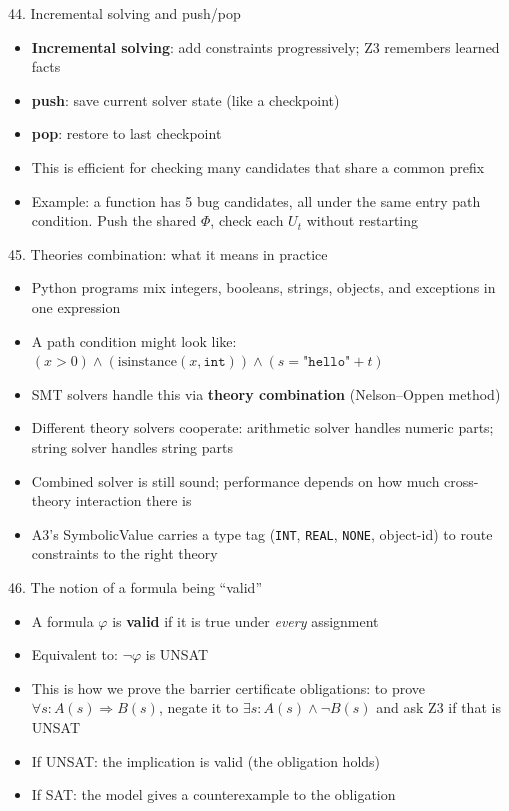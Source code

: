 \documentclass[aspectratio=169]{beamer}
\begin{document}
\begin{frame}{44. Incremental solving and push/pop}
\begin{itemize}
  \item \textbf{Incremental solving}: add constraints progressively; Z3 remembers learned facts
  \item \textbf{push}: save current solver state (like a checkpoint)
  \item \textbf{pop}: restore to last checkpoint
  \item This is efficient for checking many candidates that share a common prefix
  \item Example: a function has 5 bug candidates, all under the same entry path condition.
    Push the shared \(\Phi\), check each \(U_t\) without restarting
\end{itemize}
\end{frame}

\begin{frame}{45. Theories combination: what it means in practice}
\begin{itemize}
  \item Python programs mix integers, booleans, strings, objects, and exceptions in one expression
  \item A path condition might look like: \((x > 0) \wedge (\text{isinstance}(x, \texttt{int})) \wedge (s = \texttt{"hello"} + t)\)
  \item SMT solvers handle this via \textbf{theory combination} (Nelson--Oppen method)
  \item Different theory solvers cooperate: arithmetic solver handles numeric parts; string solver handles string parts
  \item Combined solver is still sound; performance depends on how much cross-theory interaction there is
  \item A3's SymbolicValue carries a type tag (\texttt{INT}, \texttt{REAL}, \texttt{NONE}, object-id) to route constraints to the right theory
\end{itemize}
\end{frame}

\begin{frame}{46. The notion of a formula being ``valid''}
\begin{itemize}
  \item A formula \(\varphi\) is \textbf{valid} if it is true under \emph{every} assignment
  \item Equivalent to: \(\neg\varphi\) is UNSAT
  \item This is how we prove the barrier certificate obligations: to prove \(\forall s: A(s) \Rightarrow B(s)\), negate it to \(\exists s: A(s) \wedge \neg B(s)\) and ask Z3 if that is UNSAT
  \item If UNSAT: the implication is valid (the obligation holds)
  \item If SAT: the model gives a counterexample to the obligation
\end{itemize}
\end{frame}
\end{document}
